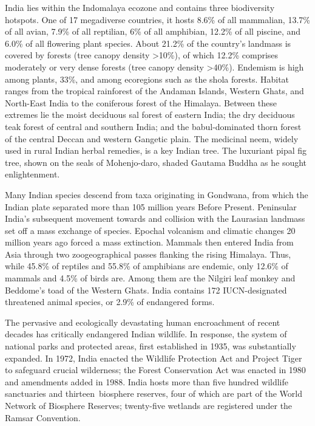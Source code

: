 India lies within the Indomalaya ecozone and contains three biodiversity
hotspots. One of 17 megadiverse countries, it hosts 8.6\% of all
mammalian, 13.7\% of all avian, 7.9\% of all reptilian, 6\% of all
amphibian, 12.2\% of all piscine, and 6.0\% of all flowering plant
species. About 21.2\% of the country's landmass is covered by forests
(tree canopy density \textgreater{}10\%), of which 12.2\% comprises
moderately or very dense forests (tree canopy density
\textgreater{}40\%). Endemism is high among plants, 33\%, and among
ecoregions such as the shola forests. Habitat ranges from the tropical
rainforest of the Andaman Islands, Western Ghats, and North-East India
to the coniferous forest of the Himalaya. Between these extremes lie the
moist deciduous sal forest of eastern India; the dry deciduous teak
forest of central and southern India; and the babul-dominated thorn
forest of the central Deccan and western Gangetic plain. The medicinal
neem, widely used in rural Indian herbal remedies, is a key Indian tree.
The luxuriant pipal fig tree, shown on the seals of Mohenjo-daro, shaded
Gautama Buddha as he sought enlightenment.

Many Indian species descend from taxa originating in Gondwana, from
which the Indian plate separated more than 105 million years Before
Present. Peninsular India's subsequent movement towards and collision
with the Laurasian landmass set off a mass exchange of species. Epochal
volcanism and climatic changes 20 million years ago forced a mass
extinction. Mammals then entered India from Asia through two
zoogeographical passes flanking the rising Himalaya. Thus, while 45.8\%
of reptiles and 55.8\% of amphibians are endemic, only 12.6\% of mammals
and 4.5\% of birds are. Among them are the Nilgiri leaf monkey and
Beddome's toad of the Western Ghats. India contains 172 IUCN-designated
threatened animal species, or 2.9\% of endangered forms.

The pervasive and ecologically devastating human encroachment of recent
decades has critically endangered Indian wildlife. In response, the
system of national parks and protected areas, first established in 1935,
was substantially expanded. In 1972, India enacted the Wildlife
Protection Act and Project Tiger to safeguard crucial wilderness; the
Forest Conservation Act was enacted in 1980 and amendments added in
1988. India hosts more than five hundred wildlife sanctuaries and
thirteen~biosphere reserves, four of which are part of the World Network
of Biosphere Reserves; twenty-five wetlands are registered under the
Ramsar Convention.

